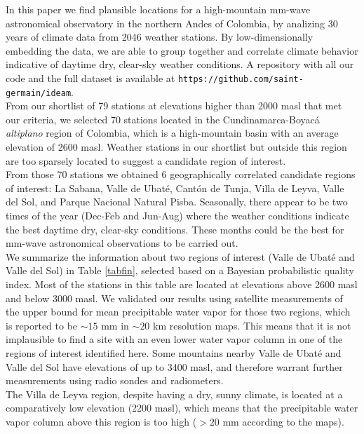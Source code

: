 \documentclass[a4paper,fleqn,usenatbib]{mnras}
\begin{document}
In this paper we find plausible locations for a high-mountain mm-wave astronomical observatory in the northern Andes of Colombia, by analizing 30 years of climate data from 2046 weather stations. By low-dimensionally embedding the data, we are able to group together and correlate climate behavior indicative of daytime dry, clear-sky weather conditions.  A repository with all our code and the full dataset is available at \texttt{https://github.com/saint-germain/ideam}.\\

From our shortlist of 79 stations at elevations higher than 2000 masl that met our criteria, we selected 70 stations located  in the Cundinamarca-Boyac\'a \emph{altiplano} region of Colombia, which is a high-mountain basin with an average elevation of 2600 masl. Weather stations in our shortlist but outside this region are too sparsely located to suggest a candidate region of interest. \\

From those 70 stations we obtained 6 geographically correlated candidate regions of interest: La Sabana, Valle de Ubat\'e, Cant\'on de Tunja, Villa de Leyva, Valle del Sol, and Parque Nacional Natural Pisba. Seasonally, there appear to be two times of the year (Dec-Feb and Jun-Aug) where the weather conditions indicate the best daytime dry, clear-sky conditions. These months could be the best for mm-wave astronomical observations to be carried out.\\

We summarize the information about two regions of interest (Valle de Ubat\'e and Valle del Sol) in Table \ref{tabfin}, selected based on a Bayesian probabilistic quality index. Most of the stations in this table are located at elevations above 2600 masl and below 3000 masl. We validated our results using satellite measurements of the upper bound for mean precipitable water vapor \citep{suen2014,suen2016} for those two regions, which is reported to be $\sim15$ mm in $\sim20$ km resolution maps. This means that it is not implausible to find a site with an even lower water vapor column in one of the regions of interest identified here. Some mountains nearby Valle de Ubat\'e and Valle del Sol  have elevations of up to 3400 masl, and therefore warrant further measurements using radio sondes and radiometers. \\

The Villa de Leyva region, despite having a dry, sunny climate, is located at a comparatively low elevation (2200 masl), which means that the precipitable water vapor column above this region is too high ($>20$ mm according to the \citet{suen2016} maps).\\
\end{document}
